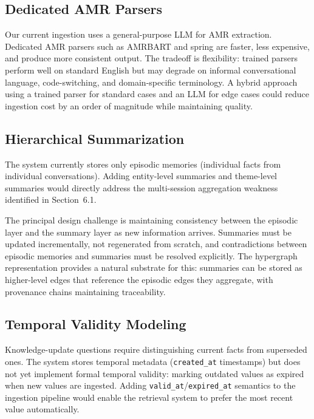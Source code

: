 \documentclass[11pt,a4paper]{article}
\begin{document}
\subsection{Dedicated AMR Parsers}

Our current ingestion uses a general-purpose LLM for AMR extraction. Dedicated AMR parsers such as AMRBART \citep{bai2022amrbart} and spring \citep{bevilacqua2021spring} are faster, less expensive, and produce more consistent output. The tradeoff is flexibility: trained parsers perform well on standard English but may degrade on informal conversational language, code-switching, and domain-specific terminology. A hybrid approach using a trained parser for standard cases and an LLM for edge cases could reduce ingestion cost by an order of magnitude while maintaining quality.

\subsection{Hierarchical Summarization}

The system currently stores only episodic memories (individual facts from individual conversations). Adding entity-level summaries and theme-level summaries would directly address the multi-session aggregation weakness identified in Section~6.1.

The principal design challenge is maintaining consistency between the episodic layer and the summary layer as new information arrives. Summaries must be updated incrementally, not regenerated from scratch, and contradictions between episodic memories and summaries must be resolved explicitly. The hypergraph representation provides a natural substrate for this: summaries can be stored as higher-level edges that reference the episodic edges they aggregate, with provenance chains maintaining traceability.

\subsection{Temporal Validity Modeling}

Knowledge-update questions require distinguishing current facts from superseded ones. The system stores temporal metadata (\texttt{created\_at} timestamps) but does not yet implement formal temporal validity: marking outdated values as expired when new values are ingested. Adding \texttt{valid\_at}/\texttt{expired\_at} semantics to the ingestion pipeline would enable the retrieval system to prefer the most recent value automatically.
\end{document}
